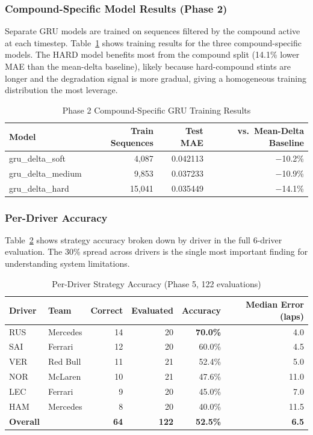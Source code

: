 \subsubsection{Compound-Specific Model Results (Phase 2)}

Separate GRU models are trained on sequences filtered by the compound active at each timestep. Table~\ref{tab:compound} shows training results 
for the three compound-specific models. The HARD model benefits most from the compound split (14.1\% lower MAE than the mean-delta baseline), likely because hard-compound
stints are longer and the degradation signal is more gradual, giving a homogeneous training distribution the most leverage.

\begin{table}[ht]
\centering
\caption{Phase 2 Compound-Specific GRU Training Results}
\label{tab:compound}
\begin{tabular}{lrrr}
\toprule
Model & Train Sequences & Test MAE & vs.\ Mean-Delta Baseline \\
\midrule
gru\_delta\_soft   & 4,087  & 0.042113 & $-$10.2\% \\
gru\_delta\_medium & 9,853  & 0.037233 & $-$10.9\% \\
gru\_delta\_hard   & 15,041 & 0.035449 & $-$14.1\% \\
\bottomrule
\end{tabular}
\end{table}

\subsubsection{Per-Driver Accuracy}

Table~\ref{tab:drivers} shows strategy accuracy broken down by driver in the full 6-driver evaluation. The 30\% spread across drivers is the single most important finding for understanding system limitations.

\begin{table}[ht]
\centering
\caption{Per-Driver Strategy Accuracy (Phase 5, 122 evaluations)}
\label{tab:drivers}
\begin{tabular}{llrrrr}
\toprule
Driver & Team & Correct & Evaluated & Accuracy & Median Error (laps) \\
\midrule
RUS & Mercedes & 14 & 20 & \textbf{70.0\%} & 4.0 \\
SAI & Ferrari  & 12 & 20 & 60.0\% & 4.5 \\
VER & Red Bull & 11 & 21 & 52.4\% & 5.0 \\
NOR & McLaren  & 10 & 21 & 47.6\% & 11.0 \\
LEC & Ferrari  &  9 & 20 & 45.0\% & 7.0 \\
HAM & Mercedes &  8 & 20 & 40.0\% & 11.5 \\
\midrule
\textbf{Overall} & & \textbf{64} & \textbf{122} & \textbf{52.5\%} & \textbf{6.5} \\
\bottomrule
\end{tabular}
\end{table}

